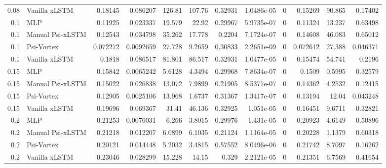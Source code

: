 \begin{tabular}{rlrrrrrrrrrr}
0.08 & Vanilla xLSTM & 0.18145 & 0.086207 & 126.81 & 107.76 & 0.32931 & 1.0486e-05 & 0 & 0.15269 & 90.865 & 0.17402 \\
0.1 & MLP & 0.11925 & 0.023337 & 19.579 & 22.92 & 0.29967 & 5.9735e-07 & 0 & 0.11324 & 13.237 & 0.63498 \\
0.1 & Manual Psi-xLSTM & 0.12543 & 0.034798 & 35.262 & 17.778 & 0.2204 & 7.1724e-07 & 0 & 0.14608 & 46.083 & 0.65012 \\
0.1 & Psi-Vortex & 0.072272 & 0.0092659 & 27.728 & 9.2659 & 0.30833 & 2.2651e-09 & 0 & 0.072612 & 27.388 & 0.046371 \\
0.1 & Vanilla xLSTM & 0.1818 & 0.086517 & 81.801 & 86.517 & 0.32931 & 1.0477e-05 & 0 & 0.15474 & 54.741 & 0.2196 \\
0.15 & MLP & 0.15842 & 0.0065242 & 5.6128 & 4.3494 & 0.29968 & 7.8634e-07 & 0 & 0.1509 & 0.5995 & 0.32579 \\
0.15 & Manual Psi-xLSTM & 0.15022 & 0.026838 & 13.072 & 7.9899 & 0.21905 & 8.5377e-07 & 0 & 0.14362 & 4.2532 & 0.12415 \\
0.15 & Psi-Vortex & 0.12905 & 0.0025106 & 13.968 & 1.6737 & 0.31367 & 1.3417e-07 & 0 & 0.13194 & 12.04 & 0.043248 \\
0.15 & Vanilla xLSTM & 0.19696 & 0.069367 & 31.41 & 46.136 & 0.32925 & 1.051e-05 & 0 & 0.16451 & 9.6711 & 0.32821 \\
0.2 & MLP & 0.21253 & 0.0076031 & 6.266 & 3.8015 & 0.29976 & 1.431e-05 & 0 & 0.20923 & 4.6149 & 0.50896 \\
0.2 & Manual Psi-xLSTM & 0.21218 & 0.012207 & 6.0899 & 6.1035 & 0.21124 & 1.1164e-05 & 0 & 0.20228 & 1.1379 & 0.60318 \\
0.2 & Psi-Vortex & 0.20121 & 0.014448 & 5.2032 & 3.4815 & 0.57552 & 8.0496e-06 & 0 & 0.21742 & 8.7097 & 0.16262 \\
0.2 & Vanilla xLSTM & 0.23046 & 0.028299 & 15.228 & 14.15 & 0.329 & 2.2121e-05 & 0 & 0.21351 & 6.7569 & 0.41654 \\
\bottomrule
\end{tabular}

